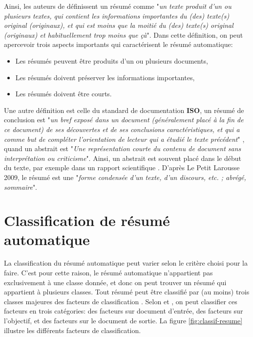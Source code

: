 \documentclass[a4paper,12pt,oneside]{../use/ESIthesis}
\begin{document}
Ainsi, les auteurs de \cite{02-radev-al} définissent un résumé comme "\textit{un texte produit d'un ou plusieurs textes, 
qui contient les informations importantes du (des) texte(s) original (originaux),
et qui est moins que la moitié du (des) texte(s) original (originaux) et habituellement trop moins que çà}".
Dans cette définition, on peut apercevoir trois aspects importants qui caractérisent le résumé automatique:
\begin{itemize}
\item Les résumés peuvent être produits d'un ou plusieurs documents,
\item Les résumés doivent préserver les informations importantes,
\item Les résumés doivent être courts.
\end{itemize}

Une autre définition est celle du standard de documentation \textbf{ISO}, un résumé de conclusion est "\textit{un bref exposé dans un document (généralement placé à la fin de ce document) de ses découvertes et de ses conclusions caractéristiques, et qui a comme but de compléter l'orientation de lecteur qui a étudié le texte précédent}" \cite{02-minel}, quand un abstrait est "\textit{Une représentation courte du contenu de document sans interprétation ou criticisme}". 
Ainsi, un abstrait est souvent placé dans le début du texte, par exemple dans un rapport scientifique \cite{07-hassel}.
D'après Le Petit Larousse 2009, le résumé est une "\textit{forme condensée d'un texte, d'un discours, etc. ; abrégé, sommaire}". 

\section{Classification de résumé automatique}

La classification du résumé automatique peut varier selon le critère choisi pour la faire. 
C'est pour cette raison, le résumé automatique n'appartient pas exclusivement à une classe donnée, et donc on peut trouver un résumé qui appartient à plusieurs classes. 
Tout résumé peut être classifié par (au moins) trois classes majeures des facteurs de classification \cite{98-hovy-lin}. 
Selon \cite{99-sparckjones} et \cite{98-hovy-lin}, on peut classifier ces facteurs en trois catégories: des facteurs sur document d'entrée, des facteurs sur l'objectif, et des facteurs sur le document de sortie. 
La figure \ref{fig:classif-resume} illustre les différents facteurs de classification.
\end{document}
